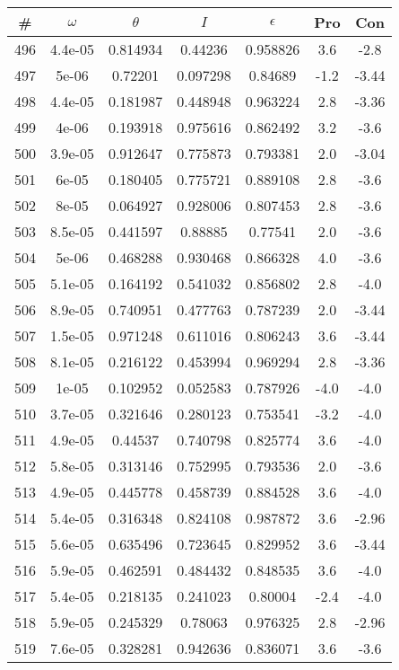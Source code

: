 \begin{table}
\begin{tabular}{c|c|c|c|c|c|c}
\# & $\omega$ & $\theta$ & $I$ & $\epsilon$ & Pro & Con\\
\hline
496 & 4.4e-05 & 0.814934 & 0.44236 & 0.958826 & 3.6 & -2.8\\
497 & 5e-06 & 0.72201 & 0.097298 & 0.84689 & -1.2 & -3.44\\
498 & 4.4e-05 & 0.181987 & 0.448948 & 0.963224 & 2.8 & -3.36\\
499 & 4e-06 & 0.193918 & 0.975616 & 0.862492 & 3.2 & -3.6\\
500 & 3.9e-05 & 0.912647 & 0.775873 & 0.793381 & 2.0 & -3.04\\
501 & 6e-05 & 0.180405 & 0.775721 & 0.889108 & 2.8 & -3.6\\
502 & 8e-05 & 0.064927 & 0.928006 & 0.807453 & 2.8 & -3.6\\
503 & 8.5e-05 & 0.441597 & 0.88885 & 0.77541 & 2.0 & -3.6\\
504 & 5e-06 & 0.468288 & 0.930468 & 0.866328 & 4.0 & -3.6\\
505 & 5.1e-05 & 0.164192 & 0.541032 & 0.856802 & 2.8 & -4.0\\
506 & 8.9e-05 & 0.740951 & 0.477763 & 0.787239 & 2.0 & -3.44\\
507 & 1.5e-05 & 0.971248 & 0.611016 & 0.806243 & 3.6 & -3.44\\
508 & 8.1e-05 & 0.216122 & 0.453994 & 0.969294 & 2.8 & -3.36\\
509 & 1e-05 & 0.102952 & 0.052583 & 0.787926 & -4.0 & -4.0\\
510 & 3.7e-05 & 0.321646 & 0.280123 & 0.753541 & -3.2 & -4.0\\
511 & 4.9e-05 & 0.44537 & 0.740798 & 0.825774 & 3.6 & -4.0\\
512 & 5.8e-05 & 0.313146 & 0.752995 & 0.793536 & 2.0 & -3.6\\
513 & 4.9e-05 & 0.445778 & 0.458739 & 0.884528 & 3.6 & -4.0\\
514 & 5.4e-05 & 0.316348 & 0.824108 & 0.987872 & 3.6 & -2.96\\
515 & 5.6e-05 & 0.635496 & 0.723645 & 0.829952 & 3.6 & -3.44\\
516 & 5.9e-05 & 0.462591 & 0.484432 & 0.848535 & 3.6 & -4.0\\
517 & 5.4e-05 & 0.218135 & 0.241023 & 0.80004 & -2.4 & -4.0\\
518 & 5.9e-05 & 0.245329 & 0.78063 & 0.976325 & 2.8 & -2.96\\
519 & 7.6e-05 & 0.328281 & 0.942636 & 0.836071 & 3.6 & -3.6\\

\end{tabular}
\end{table}
